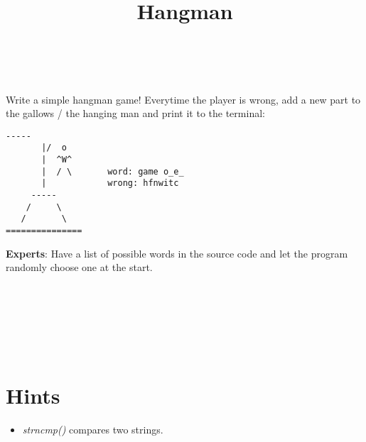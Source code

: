 

\title{Hangman} %
\author{} %
\renewcommand{\difficulty}{Very Hard} %
\renewcommand{\requirements}{All you learned in C-Introduction} %
\renewcommand{\aims}{Apply your knowledge} %


 \maketitle
 \taskinfos

\ \\\ \\

Write a simple hangman game! Everytime the player is wrong,
add a new part to the gallows / the hanging man and print it to the terminal:
\begin{lstlisting}[numbers=none]
       -----    
       |/  o 
       |  ^W^
       |  / \		word: game o_e_
       |     		wrong: hfnwitc
     -----   
    /     \
   /       \
===============
\end{lstlisting}
\textbf{Experts}: Have a list of possible words in the source code and let the program randomly choose one at the start.
 
 
\ \\\ \\\ \\\ \\\ \\
\section*{Hints}
	\begin{itemize}
		\item \textit{strncmp()} compares two strings.	
	\end{itemize}
 

